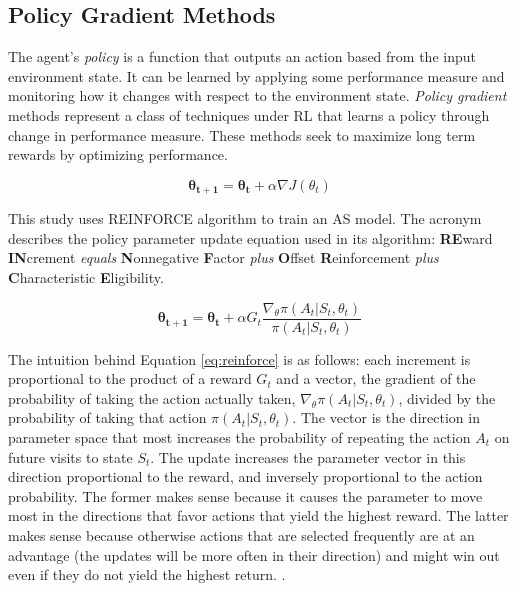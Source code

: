 \subsection{Policy Gradient Methods}

The agent's \textit{policy} is a function that outputs an action based from the input environment state. It can be learned by applying some performance measure and monitoring how it changes with respect to the environment state. \textit{Policy gradient} methods represent a class of techniques under RL that learns a policy through change in performance measure. These methods seek to maximize long term rewards by optimizing performance.

\begin{equation}
\mathbf{\theta_{t+1}} = \mathbf{\theta_t} + \alpha \nabla J(\theta_t)
\label{eq:pgrad}
\end{equation}

This study uses REINFORCE algorithm \citep{williams1992simple} to train an AS model. The acronym describes the policy parameter update equation used in its algorithm: \textbf{RE}ward \textbf{IN}crement \textit{equals} \textbf{N}onnegative \textbf{F}actor \textit{plus} \textbf{O}ffset \textbf{R}einforcement \textit{plus} \textbf{C}haracteristic \textbf{E}ligibility. 

\begin{equation}
\mathbf{\theta_{t+1}} = \mathbf{\theta_t} + \alpha G_t \frac{\nabla_\theta\pi(A_t|S_t, \theta_t)}{\pi(A_t|S_t, \theta_t)}
\label{eq:reinforce}
\end{equation}

The intuition behind Equation \ref{eq:reinforce} is as follows: each increment is proportional to the product of a reward $G_t$ and a vector, the gradient of the probability of taking the action actually taken, $\nabla_\theta\pi(A_t|S_t, \theta_t)$, divided by the probability of taking that action $\pi(A_t|S_t, \theta_t)$. The vector is the direction in parameter space that most increases the probability of repeating the action $A_t$ on future visits to state $S_t$. The update increases the parameter vector in this direction proportional to the reward, and inversely proportional to the action probability. The former makes sense because it causes the parameter to move most in the directions that favor actions that yield the highest reward. The latter makes sense because otherwise actions that are selected frequently are at an advantage (the updates will be more often in their direction) and might win out even if they do not yield the highest return. \citep{sutton1998reinforcement}. 